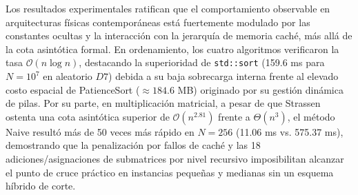 Los resultados experimentales ratifican que el comportamiento observable en arquitecturas físicas contemporáneas está fuertemente modulado por las constantes ocultas y la interacción con la jerarquía de memoria caché, más allá de la cota asintótica formal. En ordenamiento, los cuatro algoritmos verificaron la tasa $\mathcal{O}(n \log n)$, destacando la superioridad de \texttt{std::sort} (159.6 ms para $N = 10^7$ en aleatorio $D7$) debida a su baja sobrecarga interna frente al elevado costo espacial de PatienceSort ($\approx 184.6$ MB) originado por su gestión dinámica de pilas. Por su parte, en multiplicación matricial, a pesar de que Strassen ostenta una cota asintótica superior de $\mathcal{O}(n^{2.81})$ frente a $\Theta(n^3)$, el método Naive resultó más de 50 veces más rápido en $N = 256$ (11.06 ms vs. 575.37 ms), demostrando que la penalización por fallos de caché y las 18 adiciones/asignaciones de submatrices por nivel recursivo imposibilitan alcanzar el punto de cruce práctico en instancias pequeñas y medianas sin un esquema híbrido de corte.